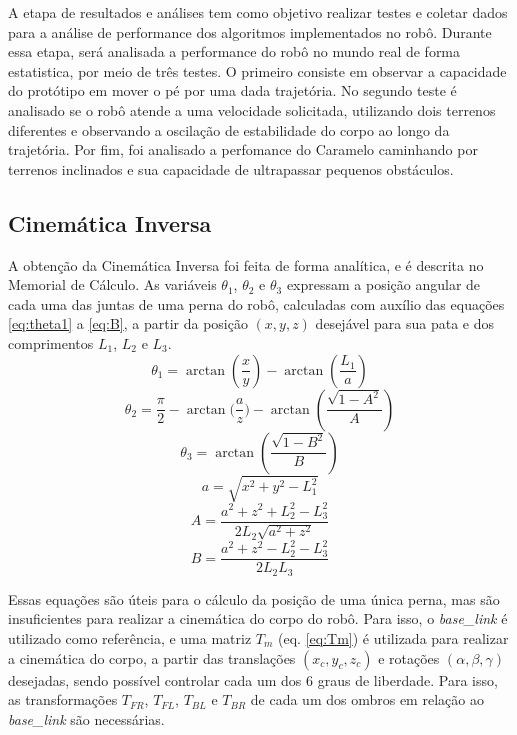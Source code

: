\documentclass[../main.tex]{subfiles}
\begin{document}
  A etapa de resultados e análises tem como objetivo realizar testes e coletar dados para a análise de performance dos algoritmos implementados no robô. Durante essa etapa, será analisada a performance do robô no mundo real de forma estatistica, por meio de três testes. O primeiro consiste em observar a capacidade do protótipo em mover o pé por uma dada trajetória. No segundo teste é analisado se o robô atende a uma velocidade solicitada, utilizando dois terrenos diferentes e observando a oscilação de estabilidade do corpo ao longo da trajetória. Por fim, foi analisado a perfomance do Caramelo caminhando por terrenos inclinados e sua capacidade de ultrapassar pequenos obstáculos.

  \subsection{Cinemática Inversa}
  A obtenção da Cinemática Inversa foi feita de forma analítica, e é descrita no Memorial de Cálculo. As variáveis $\theta_1$, $\theta_2$ e $\theta_3$ expressam a posição angular de cada uma das juntas de uma perna do robô, calculadas com auxílio das equações \ref{eq:theta1} a \ref{eq:B}, a partir da posição $(x, y, z)$ desejável para sua pata e dos comprimentos $L_1$, $L_2$ e $L_3$.
  \begin{equation}
    \label{eq:theta1}
    \theta_1 = \arctan{(\frac{x}{y})} - \arctan{(\frac{L_1}{a})}
  \end{equation}
  \begin{equation}
    \label{eq:theta2}
    \theta_2 = \frac{\pi}{2} - \arctan{(\frac{a}{z}}) - \arctan{(\frac{\sqrt{1-A^2}}{A})}
  \end{equation}
  \begin{equation}
    \label{eq:theta3}
    \theta_3 = \arctan(\frac{\sqrt{1-B^2}}{B})
  \end{equation}
  \begin{equation}
    \label{eq:a}
    a = \sqrt{x^2+y^2-L_1^2}
  \end{equation}
  \begin{equation}
    \label{eq:A}
    A =\frac{a^2+z^2+L_2^2-L_3^2}{2L_2\sqrt{a^2+z^2}}
  \end{equation}
  \begin{equation}
    \label{eq:B}
    B = \frac{a^2+z^2-L_2^2-L_3^2}{2L_2L_3}
  \end{equation}

  Essas equações são úteis para o cálculo da posição de uma única perna, mas são insuficientes para realizar a cinemática do corpo do robô. Para isso, o \textit{base\_link} é utilizado como referência, e uma matriz $T_m$ (eq. \ref{eq:Tm}) é utilizada para realizar a cinemática do corpo, a partir das translações $(x_c, y_c, z_c)$ e rotações $(\alpha, \beta, \gamma)$ desejadas, sendo possível controlar cada um dos 6 graus de liberdade. Para isso, as transformações $T_{FR}$, $T_{FL}$, $T_{BL}$ e $T_{BR}$ de cada um dos ombros em relação ao \textit{base\_link} são necessárias.
\end{document}
